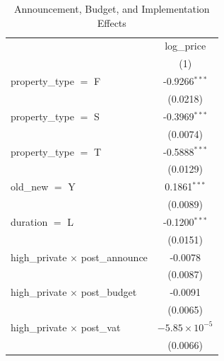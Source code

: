 
\begin{table}[htbp]
   \caption{Announcement, Budget, and Implementation Effects}
   \bigskip
   \centering
   \begin{tabular}{lc}
      \toprule
                                                                              & log\_price\\   
                                                                              & (1)\\  
      \midrule 
      property\_type $=$ F                                                    & -0.9266$^{***}$\\   
                                                                              & (0.0218)\\   
      property\_type $=$ S                                                    & -0.3969$^{***}$\\   
                                                                              & (0.0074)\\   
      property\_type $=$ T                                                    & -0.5888$^{***}$\\   
                                                                              & (0.0129)\\   
      old\_new $=$ Y                                                          & 0.1861$^{***}$\\   
                                                                              & (0.0089)\\   
      duration $=$ L                                                          & -0.1200$^{***}$\\   
                                                                              & (0.0151)\\   
      high\_private $\times$ post\_announce                                   & -0.0078\\   
                                                                              & (0.0087)\\   
      high\_private $\times$ post\_budget                                     & -0.0091\\   
                                                                              & (0.0065)\\   
      high\_private $\times$ post\_vat                                        & $-5.85\times 10^{-5}$\\    
                                                                              & (0.0066)\\   

\end{tabular}
\end{table}

